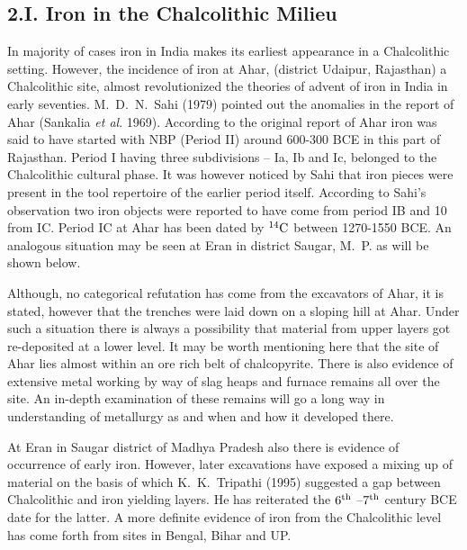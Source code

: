 \vspace{-.48cm}

\subsection*{2.I. Iron in the Chalcolithic Milieu}\label{chapter3-subsection-4}

\vspace{-.2cm}

In majority of cases iron in India makes its earliest appearance in a Chalcolithic setting. However, the incidence of iron at Ahar, (district Udaipur, Rajasthan) a Chalcolithic site, almost revolutionized the theories of advent of iron in India in early seventies. M.~D.~N.~Sahi (1979) pointed out the anomalies in the report of Ahar (Sankalia \textit{et al}. 1969). According to the original report of Ahar iron was said to have started with NBP (Period II) around 600-300 BCE in this part of Rajasthan. Period I having three subdivisions – Ia, Ib and Ic, belonged to the Chalcolithic cultural phase. It was however noticed by Sahi that iron pieces were present in the tool repertoire of the earlier period itself. According to Sahi’s observation two iron objects were reported to have come from period IB and 10 from IC. Period IC at Ahar has been dated by $^{14}{\rm C}$ between 1270-1550 BCE. An analogous situation may be seen at Eran in district Saugar, M.~P. as will be shown below.

Although, no categorical refutation has come from the excavators of Ahar, it is stated, however that the trenches were laid down on a sloping hill at Ahar. Under such a situation there is always a possibility that material from upper layers got re-deposited at a lower level. It may be worth mentioning here that the site of Ahar lies almost within an ore rich belt of chalcopyrite. There is also evidence of extensive metal working by way of slag heaps and furnace remains all over the site. An in-depth examination of these remains will go a long way in understanding of metallurgy as and when and how it developed there.

At Eran in Saugar district of Madhya Pradesh also there is evidence of occurrence of early iron. However, later excavations have exposed a mixing up of material on the basis of which K.~K.~Tripathi (1995) suggested a gap between Chalcolithic and iron yielding layers. He has reiterated the $6^{\rm th}$ –$7^{\rm th}$ century BCE date for the latter. A more definite evidence of iron from the Chalcolithic level has come forth from sites in Bengal, Bihar and UP.

